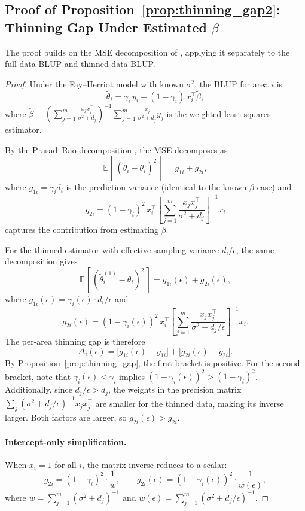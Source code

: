 \documentclass[11pt]{article}
\newcommand{\E}[2][]{\mathbb{E}_{#1}\!\left[\,#2\,\right]}
\theoremstyle{plain}
\theoremstyle{definition}
\theoremstyle{remark}
\begin{document}
\subsection{Proof of Proposition~\ref{prop:thinning_gap2}: Thinning Gap Under Estimated $\beta$}
\label{app:thinning_gap2}

The proof builds on the MSE decomposition of \citet{prasad_estimation_1990}, applying it separately to the full-data BLUP and thinned-data BLUP.

\begin{proof}
Under the Fay--Herriot model with known $\sigma^2$, the BLUP for area $i$ is
\[
\tilde{\theta}_i = \gamma_i \, y_i + (1-\gamma_i) \, x_i^\top \tilde{\beta},
\]
where $\tilde{\beta} = \left(\sum_{j=1}^m \frac{x_j x_j^\top}{\sigma^2 + d_j}\right)^{-1} \sum_{j=1}^m \frac{x_j }{\sigma^2 + d_j} y_j$ is the weighted least-squares estimator.

By the Prasad--Rao decomposition \citep{prasad_estimation_1990}, the MSE decomposes as
\[
\E{(\tilde{\theta}_i - \theta_i)^2} = g_{1i} + g_{2i},
\]
where $g_{1i} = \gamma_i d_i$ is the prediction variance (identical to the known-$\beta$ case) and
\[
g_{2i} = (1-\gamma_i)^2 \, x_i^\top \left[\sum_{j=1}^m \frac{x_j x_j^\top}{\sigma^2 + d_j}\right]^{-1} x_i
\]
captures the contribution from estimating $\beta$.

For the thinned estimator with effective sampling variance $d_i/\epsilon$, the same decomposition gives
\[
\E{(\tilde{\theta}_i^{(1)} - \theta_i)^2} = g_{1i}(\epsilon) + g_{2i}(\epsilon),
\]
where $g_{1i}(\epsilon) = \gamma_i(\epsilon) \cdot d_i/\epsilon$ and
\[
g_{2i}(\epsilon) = (1-\gamma_i(\epsilon))^2 \, x_i^\top \left[\sum_{j=1}^m \frac{x_j x_j^\top}{\sigma^2 + d_j/\epsilon}\right]^{-1} x_i.
\]
The per-area thinning gap is therefore
\[
\Delta_i(\epsilon) = \big[g_{1i}(\epsilon) - g_{1i}\big] + \big[g_{2i}(\epsilon) - g_{2i}\big].
\]
By Proposition~\ref{prop:thinning_gap}, the first bracket is positive. For the second bracket, note that $\gamma_i(\epsilon) < \gamma_i$ implies $(1-\gamma_i(\epsilon))^2 > (1-\gamma_i)^2$. Additionally, since $d_j/\epsilon > d_j$, the weights in the precision matrix $\sum_j (\sigma^2 + d_j/\epsilon)^{-1} x_j x_j^\top$ are smaller for the thinned data, making its inverse larger. Both factors are larger, so $g_{2i}(\epsilon) > g_{2i}$.

\paragraph{Intercept-only simplification.}
When $x_i = 1$ for all $i$, the matrix inverse reduces to a scalar:
\[
g_{2i} = (1-\gamma_i)^2 \cdot \frac{1}{w}, \qquad g_{2i}(\epsilon) = (1-\gamma_i(\epsilon))^2 \cdot \frac{1}{w(\epsilon)},
\]
where $w = \sum_{j=1}^m (\sigma^2 + d_j)^{-1}$ and $w(\epsilon) = \sum_{j=1}^m (\sigma^2 + d_j/\epsilon)^{-1}$.
\end{proof}
\end{document}
